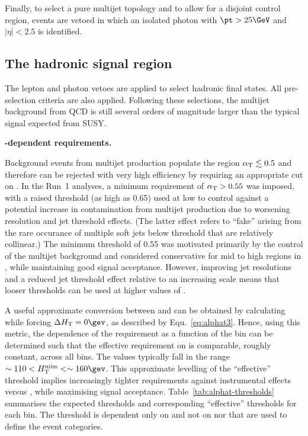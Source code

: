 Finally, to select a pure multijet topology and to allow for a
disjoint control region, events are vetoed in which an isolated photon
with $\pt > 25\GeV$ and $|\eta| < 2.5$ is identified.

\subsection{The hadronic signal region}
\label{sec:had-signal}

The lepton and photon vetoes are applied to select hadronic final
states. All pre-selection criteria are also applied. Following these
selections, the multijet background from QCD is still several orders
of magnitude larger than the typical signal expected from SUSY.

{\bf \HT-dependent \alphat requirements.}

Background events from multijet production populate the region
$\alpha_{\text{T}} \lesssim 0.5$ and therefore can be rejected with very high
efficiency by requiring an appropriate cut on \alphat. In the Run~1
analyses, a minimum requirement of $\alpha_{\text{T}} > 0.55$ was imposed, with
a raised threshold (as high as 0.65) used at low \HT to control
against a potential increase in contamination from multijet production
due to worsening resolution and jet \PT threshold effects.  (The
latter effect refers to ``fake'' \mht arising from the rare occurance
of multiple soft jets below threshold that are relatively collinear.)
The minimum threshold of 0.55 was motivated primarily by the control
of the multijet background and considered conservative for mid to high
regions in \HT, while maintaining good signal acceptance. However,
improving jet resolutions and a reduced jet threshold effect relative
to an increasing \HT scale means that looser \alphat thresholds can be
used at higher values of \HT.

A useful approximate conversion between \alphat and \mht can be
obtained by calculating \alphat while forcing $\dht = 0\gev$, as
described by Equ.~\ref{eq:alphat3}. Hence, using this metric, the
dependence of the \alphat requirement as a function of the \HT bin can
be determined such that the effective requirement on \mht is
comparable, \ie roughly constant, across all \HT bins. The values
typically fall in the range $\sim110 < \mht < \sim160\gev$. This
approximate levelling of the ``effective'' \mht threshold implies
increasingly tighter requirements against instrumental effects versus
\HT, while maximising signal
acceptance. Table~\ref{tab:alphat-thresholds} summarises the expected
\alphat thresholds and corresponding ``effective'' \mht thresholds for
each \HT bin. The \alphat threshold is dependent only on \HT and not
on \njet nor \nb that are used to define the event categories.

